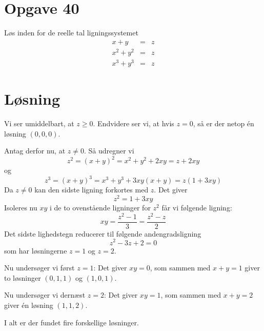 \documentclass[12pt,oneside,a4paper]{article}
\newcommand{\bas}{\begin{eqnarray*}}
\newcommand{\eas}{\end{eqnarray*}}
\begin{document}
\section{Opgave 40}
Løs inden for de reelle tal ligningssystemet
\bas
x+y &=& z \\
x^2+y^2 &=& z \\
x^3+y^3 &=& z
\eas

\section{Løsning}
Vi ser umiddelbart, at $z \ge 0$. Endvidere ser vi, at hvis $z=0$, så er der netop én løsning $(0, 0, 0)$.

Antag derfor nu, at $z \ne 0$. Så udregner vi
$$
z^2 = (x+y)^2 = x^2+y^2+2xy = z+2xy
$$
og 
$$
z^3 = (x+y)^3 = x^3+y^3+3xy(x+y) = z(1+3xy)
$$
Da $z\ne 0$ kan den sidste ligning forkortes med $z$. Det giver 
$$
z^2=1+3xy
$$
Isoleres nu $xy$ i de to ovenstående ligninger for $z^2$ får vi følgende ligning:
$$
xy = \frac{z^2-1}{3} = \frac{z^2-z}{2}
$$
Det sidste lighedstegn reducerer til følgende andengradsligning
$$
z^2-3z+2=0
$$
som har løsningerne $z=1$ og $z=2$.

Nu undersøger vi først $z=1$: Det giver $xy=0$, som sammen med $x+y=1$ giver to løsninger $(0, 1, 1)$ og $(1, 0, 1)$.

Nu undersøger vi dernæst $z=2$: Det giver $xy=1$, som sammen med $x+y=2$ giver én løsning $(1, 1, 2)$.

I alt er der fundet fire forskellige løsninger.
\end{document}
